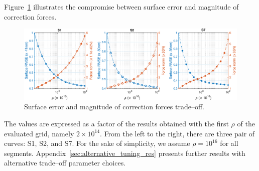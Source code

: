 \documentclass{gmto}
\begin{document}
Figure~\ref{fig:rho_tradeoff} illustrates the compromise between surface error and magnitude of correction forces. %
%
\begin{figure}[!hbt]
    \vspace{6pt}
    \centering
    \includegraphics[width=\textwidth]{./pictures/rho_tradeoff_v2.eps}
    \caption{Surface error and magnitude of correction forces trade--off.}
    \label{fig:rho_tradeoff}
\end{figure}
The values are expressed as a factor of the results obtained with the first $\rho$ of the evaluated grid, namely $2\times10^{14}$. From the left to the right, there are three pair of curves: \textsf{S1}, \textsf{S2}, and \textsf{S7}. For the sake of simplicity, we assume $\rho = 10^{16}$ for all segments. Appendix~\ref{sec:alternative_tuning_res} presents further results with alternative trade--off parameter choices.
\end{document}
